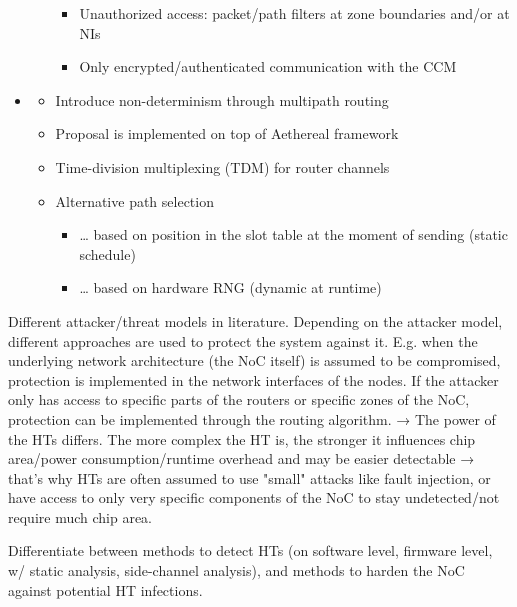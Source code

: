 \documentclass[
	paper=a4,
	fontsize=11pt,
	parskip=full %
]{scrreprt}
\begin{document}
\begin{itemize}
\begin{itemize}
\begin{itemize}
                        \item Unauthorized access: packet/path filters at zone boundaries and/or at NIs
                        \item Only encrypted/authenticated communication with the CCM
                    \end{itemize}
            \end{itemize}
        \item \textbf{}
            \begin{itemize}
                \item Introduce non-determinism through multipath routing
                \item Proposal is implemented on top of Aethereal framework
                \item Time-division multiplexing (TDM) for router channels
                \item Alternative path selection
                    \begin{itemize}
                        \item … based on position in the slot table at the moment of sending (static schedule)
                        \item … based on hardware RNG (dynamic at runtime)
                    \end{itemize}
            \end{itemize}
    \end{itemize}

    Different attacker/threat models in literature. Depending on the attacker model, different approaches are used to protect the system against it.
    E.g. when the underlying network architecture (the NoC itself) is assumed to be compromised, protection is implemented in the network interfaces
    of the nodes. If the attacker only has access to specific parts of the routers or specific zones of the NoC, protection can be implemented through
    the routing algorithm. → The power of the HTs differs. The more complex the HT is, the stronger it influences chip area/power consumption/runtime
    overhead and may be easier detectable → that's why HTs are often assumed to use "small" attacks like fault injection, or have access to only very
    specific components of the NoC to stay undetected/not require much chip area.

    Differentiate between methods to detect HTs (on software level, firmware level, w/ static analysis, side-channel analysis), and methods to harden
    the NoC against potential HT infections.
\end{document}

